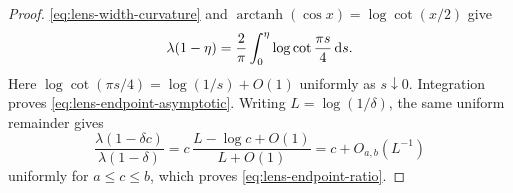 \begin{proof}
\eqref{eq:lens-width-curvature} and $\operatorname{arctanh}(\cos x)=\log\cot(x/2)$ give
\[
 \lambda(1-\eta)=\frac2\pi\int_0^\eta
                  \log\cot\frac{\pi s}{4}\,\mathrm{d} s.
\]
Here $\log\cot(\pi s/4)=\log(1/s)+O(1)$ uniformly as $s\downarrow0$. Integration proves \eqref{eq:lens-endpoint-asymptotic}. Writing $L=\log(1/\delta)$, the same uniform remainder gives
\[
 \frac{\lambda(1-\delta c)}{\lambda(1-\delta)}
 =c\,\frac{L-\log c+O(1)}{L+O(1)}
 =c+O_{a,b}(L^{-1})
\]
uniformly for $a\leq c\leq b$, which proves \eqref{eq:lens-endpoint-ratio}.
\end{proof}
